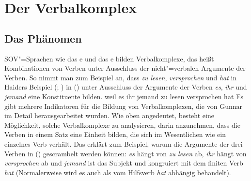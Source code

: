 
\chapter{Der Verbalkomplex}
\label{chap-verbal-complex}


\section{Das Phänomen}

SOV"=Sprachen wie das e und das e bilden Verbalkomplexe, das heißt
Kombinationen von Verben unter Ausschluss der nicht"=verbalen Argumente der Verben. So nimmt man zum
Beispiel an, dass \emph{zu lesen}, \emph{versprochen} und \emph{hat} in Haiders Beispiel (\citeyear[]{Haider86c}; \citeyear[]{Haider90b}) in () unter Ausschluss der Argumente der Verben
\emph{es}, \emph{ihr} und \emph{jemand} eine Konstituente bilden.
\ea\label{ex-weil-es-ihr-jemand-zu-lesen-versprochen-hat}
weil es ihr jemand zu lesen versprochen hat
\z
Es gibt mehrere Indikatoren für die Bildung von Verbalkomplexen,
die von Gunnar \citet{Bech55a} im Detail herausgearbeitet wurden. Wie oben angedeutet, besteht eine Möglichkeit, solche
Verbalkomplexe zu analysieren, darin anzunehmen, dass die Verben in einem Satz eine Einheit bilden, die sich im Wesentlichen wie ein
einzelnes Verb verhält. Das erklärt zum Beispiel, warum die Argumente der drei Verben in () gescrambelt werden können:
\emph{es} hängt von \emph{zu lesen} ab, \emph{ihr} hängt von \emph{versprochen}
ab und \emph{jemand} ist das Subjekt und kongruiert mit dem finiten Verb \emph{hat}
(Normalerweise wird es auch als vom Hilfsverb \emph{hat} abhängig behandelt).

